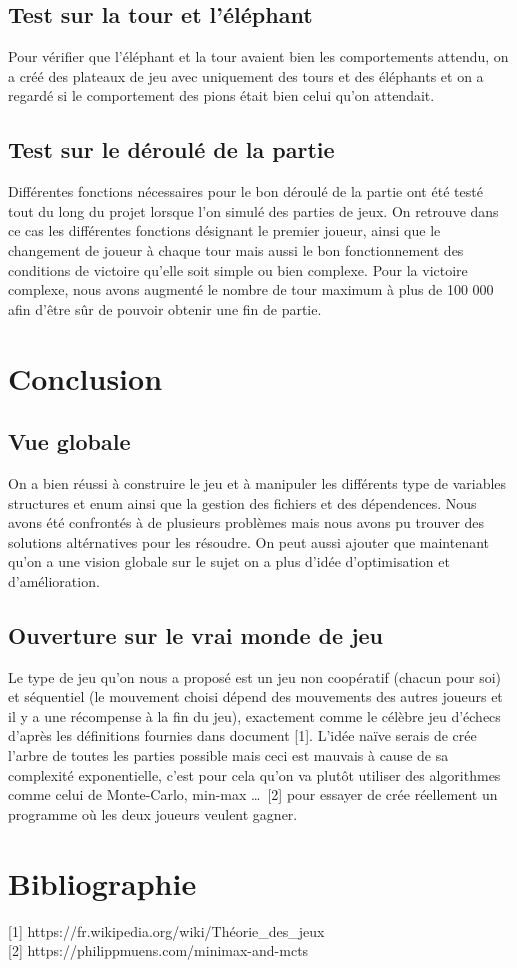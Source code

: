 \documentclass{article}
\begin{document}
\subsection{Test sur la tour et l'éléphant}

Pour vérifier que l'éléphant et la tour avaient bien les comportements attendu, on a créé des plateaux de jeu avec uniquement des tours et des éléphants et on a regardé si le comportement des pions était bien celui qu'on attendait.

\subsection{Test sur le déroulé de la partie}

Différentes fonctions nécessaires pour le bon déroulé de la partie ont été testé tout du long du projet lorsque l'on simulé des parties de jeux. On retrouve dans ce cas les différentes fonctions désignant le premier joueur, ainsi que le changement de joueur à chaque tour mais aussi le bon fonctionnement des conditions de victoire qu'elle soit simple ou bien complexe. Pour la victoire complexe, nous avons augmenté le nombre de tour maximum à plus de 100 000 afin d'être sûr de pouvoir obtenir une fin de partie.

\section{Conclusion}

\subsection{Vue globale}

On a bien réussi à construire le jeu et à manipuler les différents type de variables structures et enum ainsi que la gestion des fichiers et des dépendences. Nous avons été confrontés à de plusieurs problèmes mais nous avons pu trouver des solutions altérnatives pour les résoudre. On peut aussi ajouter que maintenant qu'on a une vision globale sur le sujet on a plus d'idée d'optimisation et d'amélioration.

\subsection{Ouverture sur le vrai monde de jeu}

Le type de jeu qu'on nous a proposé est un jeu non coopératif (chacun pour soi) et séquentiel (le mouvement choisi dépend des mouvements des autres joueurs et il y a une récompense à la fin du jeu), exactement comme le célèbre jeu d'échecs d'après les définitions fournies dans document [1]. L'idée naïve serais de crée l'arbre de toutes les parties possible mais ceci est mauvais à cause de sa complexité exponentielle, c'est pour cela qu'on va plutôt utiliser des algorithmes comme celui de Monte-Carlo, min-max \ldots \ [2] pour essayer de crée réellement un programme où les deux joueurs veulent gagner. \\

\newpage

\section{Bibliographie}

[1] https://fr.wikipedia.org/wiki/Théorie\_des\_jeux \\

[2] https://philippmuens.com/minimax-and-mcts
\end{document}
